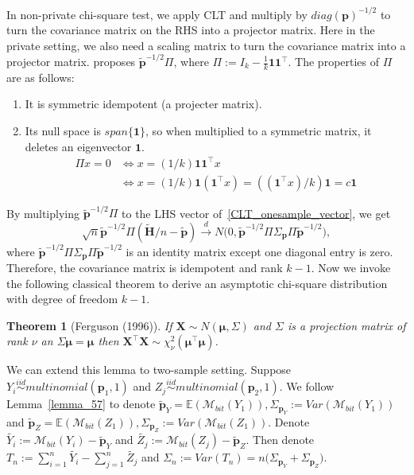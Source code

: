 \documentclass[11pt]{article} %
\newtheorem{theorem}{Theorem}[section]
\begin{document}
\noindent In non-private chi-square test, we apply CLT and
multiply by $diag(\boldsymbol{p})^{-1/2}$ to turn the  covariance matrix on the RHS into a projector matrix.
Here in the private setting, we also need a scaling matrix to turn the covariance matrix into a projector matrix.
\citet{Gaboardi2018LDPChisq} proposes $\tilde{\boldsymbol{p}}^{-1/2} \Pi$, where $\Pi := I_k - \frac{1}{k} \boldsymbol{1} \boldsymbol{1}^\top$. The properties of $\Pi$ are as follows:
\begin{enumerate}
	\item It is symmetric idempotent (a projecter matrix).
	\item Its null space is $span\{\boldsymbol{1}\}$, so when multiplied to a symmetric matrix, it deletes an eigenvector $\boldsymbol{1}$.
	\begin{align*}
		\Pi x  = 0
		&\iff
		x = (1/k) \boldsymbol{1} \boldsymbol{1}^\top x
		\\&
		\iff
		x = (1/k) \boldsymbol{1} (\boldsymbol{1}^\top x) = ((\boldsymbol{1}^\top x)/k) \boldsymbol{1} = c\boldsymbol{1}
	\end{align*}
\end{enumerate}
By multiplying $\tilde{\boldsymbol{p}}^{-1/2} \Pi$ to the LHS vector of~\eqref{CLT_onesample_vector}, we get
\begin{equation}
	\sqrt{n}
	\tilde{\boldsymbol{p}}^{-1/2} \Pi
	(\tilde{\boldsymbol{H}}/n - \tilde{\boldsymbol{p}})
	\stackrel{d}{\to}
	N
	\bigl(
	0,
	\tilde{\boldsymbol{p}}^{-1/2} \Pi \Sigma_{\boldsymbol{p}} \Pi \tilde{\boldsymbol{p}}^{-1/2}
	\bigr),
\end{equation}
where
	$\tilde{\boldsymbol{p}}^{-1/2} \Pi \Sigma_{\boldsymbol{p}} \Pi \tilde{\boldsymbol{p}}^{-1/2}$ is an identity matrix except one diagonal entry is zero. Therefore, the covariance matrix is idempotent and rank $k-1$.
	Now we invoke the following classical theorem to derive an asymptotic chi-square distribution with degree of freedom $k-1$.
\begin{theorem}[Ferguson (1996)]
	If $\boldsymbol{X} \sim N( \boldsymbol{\mu}, \Sigma)$ and $\Sigma$ is a projection matrix of rank $\nu$ an
	$\Sigma \boldsymbol{\mu} = \boldsymbol{\mu}$ then $\boldsymbol{X}^\top \boldsymbol{X} \sim \chi^2_{\nu} (\boldsymbol{\mu}^\top \boldsymbol{\mu})$.
\end{theorem}


We can extend this lemma to two-sample setting.
Suppose
 $Y_i \stackrel{iid}{\sim} multinomial(\boldsymbol{p}_1, 1)$
 and
  $Z_j \stackrel{iid}{\sim} multinomial(\boldsymbol{p}_2, 1)$.
We follow Lemma~\ref{lemma_57} to denote
$\tilde{\boldsymbol{p}}_Y = \mathbb{E}(\mathcal{M}_{bit}(Y_1)), 
\Sigma_{\boldsymbol{p}_Y} := Var(\mathcal{M}_{bit}(Y_1))$
and
$\tilde{\boldsymbol{p}}_Z = \mathbb{E}(\mathcal{M}_{bit}(Z_1)),
\Sigma_{\boldsymbol{p}_Z} := Var(\mathcal{M}_{bit}(Z_1))$.
Denote 
$\tilde{Y_i} := \mathcal{M}_{bit}(Y_i) - \tilde{\boldsymbol{p}}_Y$
and
$\tilde{Z_j} := \mathcal{M}_{bit}(Z_j) - \tilde{\boldsymbol{p}}_Z$.
Then denote
$T_n := \sum_{i=1}^n \tilde{Y_i} - \sum_{j=1}^n \tilde{Z_j}$
and
$\Sigma_n := Var(T_n) =  n \bigl( \Sigma_{\boldsymbol{p}_Y} + \Sigma_{\boldsymbol{p}_Z} \bigr)$.
\end{document}
